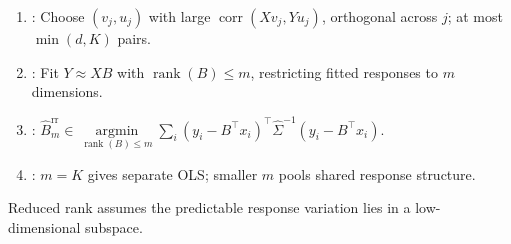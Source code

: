 \begin{method} \label{meth:sl-canonical-correlation-and-reduced-rank-regression} 
\begin{enumerate}[label=(\roman*)]
\setlength{\itemsep}{0pt}
\item {}: Choose $(v_j,u_j)$ with large $\operatorname{corr}(Xv_j,Yu_j)$, orthogonal across $j$; at most $\min(d,K)$ pairs.
\item {}: Fit $Y\approx XB$ with $\operatorname{rank}(B)\leq m$, restricting fitted responses to $m$ dimensions.
\item {}: $\widehat{B}^{\mathrm{rr}}_m\in\operatorname*{argmin}\limits_{\operatorname{rank}(B)\leq m}\sum\limits_i(y_i-B^\top x_i)^\top\widehat{\Sigma}^{-1}(y_i-B^\top x_i)$.
\item {}: $m=K$ gives separate OLS; smaller $m$ pools shared response structure.
\end{enumerate}
Reduced rank assumes the predictable response variation lies in a low-dimensional subspace.
\end{method}
